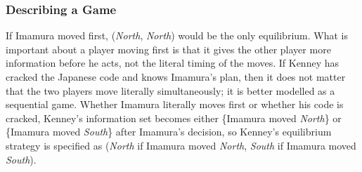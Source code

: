  \begin{frame}[fragile]\frametitle{Describing a Game}
 If Imamura moved first,   ({\it North}, {\it North}) would be the only
equilibrium.  What is important about a player moving first is that it gives the
other player more information before he acts, not the literal timing of the
moves. If       Kenney has cracked the Japanese code and knows Imamura's plan,
then it does not matter that the two players move literally simultaneously; it
is better modelled as a sequential game. Whether Imamura  literally moves first
or whether his code is cracked, Kenney's information set becomes either
\{Imamura moved {\it North}\} or \{Imamura moved {\it South}\} after Imamura's
decision, so Kenney's equilibrium strategy is specified as ({\it North} if
Imamura moved {\it North}, {\it South} if Imamura moved {\it South}).
\end{frame}

